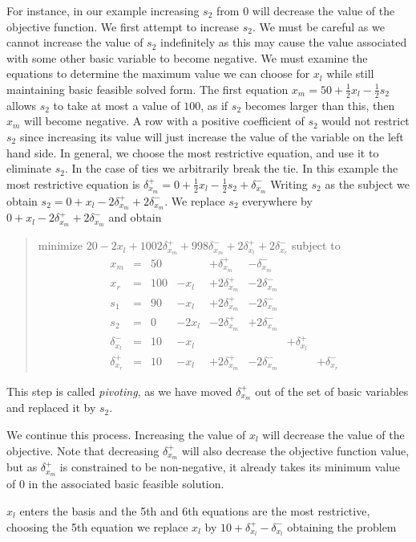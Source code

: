 \documentclass{uist96}
\begin{document}
{For instance, in our example increasing $s_2$ from $0$
will decrease the value 
of the objective function.
We first attempt to increase $s_2$. 
We must be careful as we cannot increase the
value of $s_2$ indefinitely as this may cause the value associated with some 
other basic variable to become negative. 
We must examine the equations to determine the maximum value we can choose 
for $x_l$ while still maintaining basic feasible solved form.
The first equation $x_m = 50 + \frac{1}{2} x_l - \frac{1}{2} s_2$ 
allows $s_2$ to take at most a value of $100$, 
as if $s_2$ becomes larger than this, then $x_m$
will become negative.
A row with a positive coefficient of $s_2$ would
not restrict $s_2$ since increasing
its value will just increase the value of the variable on the left hand
side.
In general, 
we choose the most restrictive equation, and use it to eliminate $s_2$.
In the case of ties we arbitrarily
break the tie. 
In this example the most restrictive equation is
$\delta_{x_m}^+  =  0  + \frac{1}{2} x_l  - \frac{1}{2} s_2  +
	\delta_{x_m}^-$
 Writing $s_2$ as the subject we obtain
$s_2 = 0 + x_l - 2 \delta_{x_m}^+ + 2\delta_{x_m}^-$\@.
We replace $s_2$ everywhere by 
$0 + x_l - 2 \delta_{x_m}^+ + 2\delta_{x_m}^-$
and obtain
\begin{quote}\vspace*{-1ex}
minimize $20 - 2 x_l + 1002 \delta_{x_m}^+ + 998 \delta_{x_m}^-  + 2
\delta_{x_l}^+ + 2\delta_{x_r}^- $ 
subject to 
$$
\begin{array}{rlrrrrrr} 
x_m & = &50 &  & + \delta_{x_m}^+ & - \delta_{x_m}^- \\
x_r & = &100 & - x_l &  + 2 \delta_{x_m}^+ & - 2\delta_{x_m}^-  \\ \hline
s_1 & = &90 & - x_l & + 2 \delta_{x_m}^+ & - 2\delta_{x_m}^- \\
s_2 & = &0 & -2 x_l& - 2 \delta_{x_m}^+ &+2\delta_{x_m}^- \\
\delta_{x_l}^- & = & 10 & - x_l & & & + \delta_{x_l}^+ \\
\delta_{x_r}^+ & = & 10 & - x_l & + 2 \delta_{x_m}^+  & - 2\delta_{x_m}^- && +\delta_{x_r}^-
\end{array}
$$
\end{quote}\vspace{-0.9ex}


This step is called \emph{pivoting},
as we have moved $\delta_{x_m}^+$ 
out of the set of basic variables and replaced it by $s_2$.

We continue this process. 
Increasing the value of $x_l$ will decrease 
the value of the objective. 
Note that decreasing $\delta_{x_m}^+$ 
will also decrease the objective function value,
but as $\delta_{x_m}^+$ is constrained to be non-negative, 
it already takes its minimum 
value of $0$ in the associated basic feasible solution.

$x_l$ enters the basis and the 5th and 6th equations are the most
restrictive,
choosing the 5th equation we replace $x_l$
by $10 + \delta_{x_l}^+ - \delta_{x_l}^-$ obtaining the problem
} %
\end{document}
